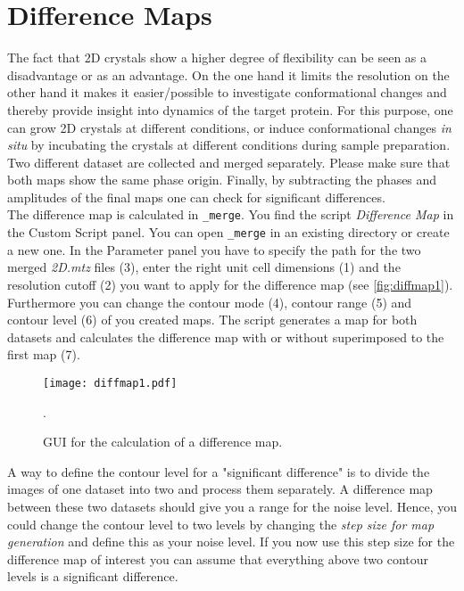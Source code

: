 \section{Difference Maps}

The fact that 2D crystals show a higher degree of flexibility can be seen as a disadvantage or as an advantage. On the one hand it limits the resolution on the other hand it makes it easier/possible to investigate conformational changes and thereby provide insight into dynamics of the target protein. For this purpose, one can grow 2D crystals at different conditions, or induce conformational changes \textit{in situ} by incubating the crystals at different conditions during sample preparation. Two different dataset are collected and merged separately. Please make sure that both maps show the same phase origin. Finally, by subtracting the phases and amplitudes of the final maps one can check for significant differences. \\

The difference map is calculated in {\twodx}\texttt{\_merge}. You find the script  \textit{Difference Map} in the Custom Script panel. You can open {\twodx}\texttt{\_merge} in an existing directory or create a new one. In the Parameter panel you have to specify the path for the two merged  \textit{2D.mtz} files (3), enter the right unit cell dimensions (1) and the resolution cutoff (2) you want to apply for the difference map (see \autoref{fig:diffmap1}). Furthermore you can change the contour mode (4), contour range (5) and contour level (6) of you created maps. The script generates a map for both datasets and calculates the difference map with or without superimposed to the first map (7).  

\begin{figure}[H]
		\centering
		\texttt{[image: diffmap1.pdf]}
		\caption{GUI for the calculation of a difference map.}.
		\label{fig:diffmap1}
	\end{figure}
	
A way to define the contour level for a "significant difference" is to divide the images of one dataset into two and process them separately. A difference map between these two datasets should give you a range for the noise level.  Hence, you could change the contour level to two levels by changing the \textit{step size for map generation} and define this as your noise level. If you now use this step size for the difference map of interest you can assume that everything above two contour levels is a significant difference. 